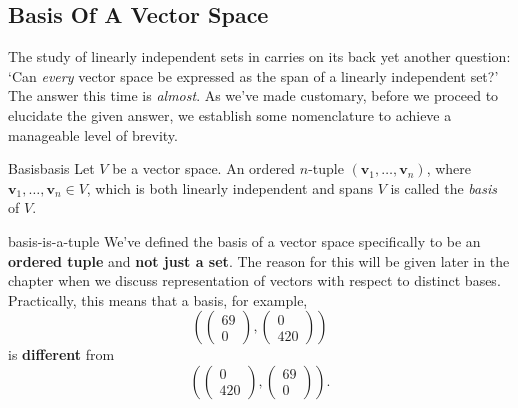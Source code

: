 \subsection{Basis Of A Vector Space}
\label{ssec:basis-of-a-vector-space}

The study of linearly independent sets in
 carries on its back
yet another question: `Can \emph{every} vector space be expressed as the span of
a linearly independent set?' The answer this time is \emph{almost}. As we've
made customary, before we proceed to elucidate the given answer, we establish
some nomenclature to achieve a manageable level of brevity.

\begin{definition}{Basis}{basis}
 Let $V$ be a vector space. An ordered $n$-tuple
 $(\mathbf{v}_1,\ldots,\mathbf{v}_n)$, where $\mathbf{v}_1,\ldots,\mathbf{v}_n
 \in V$, which is both linearly independent and spans $V$ is called the
 \emph{basis} of $V$.
\end{definition}

\begin{warning}{}{basis-is-a-tuple}
 We've defined the basis of a vector space specifically to be an \textbf{ordered
 tuple} and \textbf{not just a set}. The reason for this will be given later in
 the chapter when we discuss representation of vectors with respect to distinct
 bases. Practically, this means that a basis, for example,
 \[
  \left(
   \begin{pmatrix}
    69\\
    0
   \end{pmatrix},
   \begin{pmatrix}
    0\\
    420
   \end{pmatrix}
  \right)
 \]
 is \textbf{different} from
 \[
  \left( 
   \begin{pmatrix}
    0\\
    420
   \end{pmatrix},
   \begin{pmatrix}
    69\\
    0
   \end{pmatrix}
  \right).
 \]
\end{warning}

